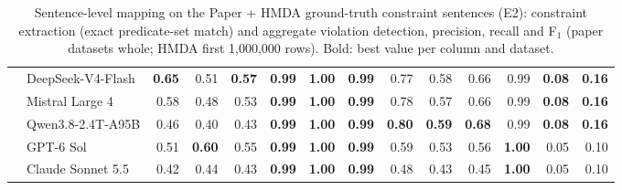 \begin{table}[t]
\begin{tabular}{l@{\hspace{0.6em}}rrr@{\hspace{0.6em}}rrr@{\hspace{0.6em}}rrr@{\hspace{0.6em}}rrr}
  ~~DeepSeek-V4-Flash & \textbf{0.65} & 0.51 & \textbf{0.57} & \textbf{0.99} & \textbf{1.00} & \textbf{0.99} & 0.77 & 0.58 & 0.66 & 0.99 & \textbf{0.08} & \textbf{0.16} \\
  ~~Mistral Large 4 & 0.58 & 0.48 & 0.53 & \textbf{0.99} & \textbf{1.00} & \textbf{0.99} & 0.78 & 0.57 & 0.66 & 0.99 & \textbf{0.08} & \textbf{0.16} \\
  ~~Qwen3.8-2.4T-A95B & 0.46 & 0.40 & 0.43 & \textbf{0.99} & \textbf{1.00} & \textbf{0.99} & \textbf{0.80} & \textbf{0.59} & \textbf{0.68} & 0.99 & \textbf{0.08} & \textbf{0.16} \\
  ~~GPT-6 Sol & 0.51 & \textbf{0.60} & 0.55 & \textbf{0.99} & \textbf{1.00} & \textbf{0.99} & 0.59 & 0.53 & 0.56 & \textbf{1.00} & 0.05 & 0.10 \\
  ~~Claude Sonnet 5.5 & 0.42 & 0.44 & 0.43 & \textbf{0.99} & \textbf{1.00} & \textbf{0.99} & 0.48 & 0.43 & 0.45 & \textbf{1.00} & 0.05 & 0.10 \\
  \bottomrule
  \end{tabular}
  \caption{Sentence-level mapping on the Paper + HMDA ground-truth constraint sentences (E2): constraint extraction (exact predicate-set match) and aggregate violation detection, precision, recall and F$_1$ (paper datasets whole; HMDA first 1,000,000 rows). Bold: best value per column and dataset.}
  \label{tab:paper_+_hmda_e2_mapping}
\end{table}